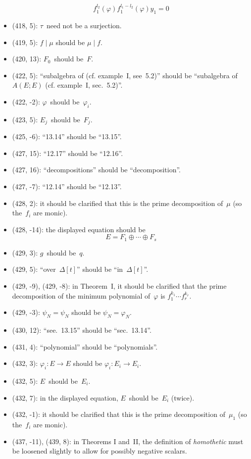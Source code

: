 \documentclass[letterpaper,12pt]{article}
\newcommand{\divides}{\mid}
\newcommand{\dsum}{\oplus}
\begin{document}
\begin{itemize}
\[f_1^{l_2}(\varphi)f_1^{l_1-l_2}(\varphi)y_1=0\]
\item (418, 5): \(\tau\)~need not be a surjection.
\item (419, 5): \(f\divides\mu\) should be \(\mu\divides f\).
\item (420, 13): \(F_0\)~should be~\(F\).
\item (422, 5): ``subalgebra of (cf. example~I, see~5.2)'' should be ``subalgebra of \(A(E;E)\) (cf. example~I, sec.~5.2)''.
\item (422, -2): \(\varphi\)~should be~\(\varphi_i\).
\item (423, 5): \(E_j\)~should be~\(F_j\).
\item (425, -6): ``13.14'' should be ``13.15''.
\item (427, 15): ``12.17'' should be ``12.16''.
\item (427, 16): ``decompositions'' should be ``decomposition''.
\item (427, -7): ``12.14'' should be ``12.13''.
\item (428, 2): it should be clarified that this is the prime decomposition of~\(\mu\) (so the~\(f_i\) are monic).
\item (428, -14): the displayed equation should be
\[E=F_1\dsum\cdots\dsum F_s\]
\item (429, 3): \(g\)~should be~\(q\).
\item (429, 5): ``over~\(\Delta[t]\)'' should be ``in~\(\Delta[t]\)''.
\item (429, -9), (429, -8): in Theorem~I, it should be clarified that the prime decomposition of the minimum polynomial of~\(\varphi\) is \(f_1^{k_1}\cdots f_r^{k_r}\).
\item (429, -3): \(\psi_N=\psi_N\) should be \(\psi_N=\varphi_N\).
\item (430, 12): ``see.~13.15'' should be ``sec.~13.14''.
\item (431, 4): ``polynomial'' should be ``polynomials''.
\item (432, 3): \(\varphi_i:E\to E\) should be \(\varphi_i:E_i\to E_i\).
\item (432, 5): \(E\)~should be~\(E_i\).
\item (432, 7): in the displayed equation, \(E\)~should be~\(E_i\) (twice).
\item (432, -1): it should be clarified that this is the prime decomposition of~\(\mu_1\) (so the~\(f_i\) are monic).
\item (437, -11), (439, 8): in Theorems I and~II, the definition of \emph{homothetic} must be loosened slightly to allow for possibly negative scalars.
\end{itemize}
\end{document}
